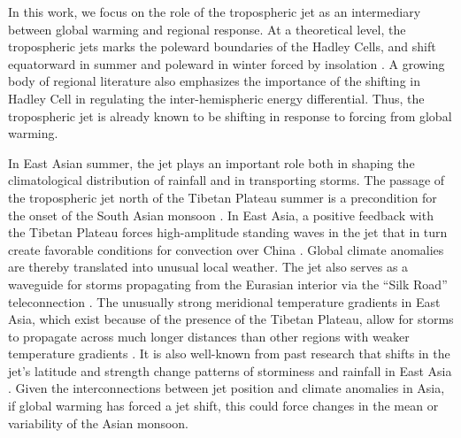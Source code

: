 	In this work, we focus on the role of the tropospheric jet as an intermediary between global warming and regional response. At a theoretical level, the tropospheric jets marks the poleward boundaries of the Hadley Cells, and shift equatorward in summer and poleward in winter forced by insolation \citep{Bordoni2008}. A growing body of regional literature also emphasizes the importance of the shifting in Hadley Cell in regulating the inter-hemispheric energy differential. Thus, the tropospheric jet is already known to be shifting in response to forcing from global warming.

	In East Asian summer, the jet plays an important role both in shaping the climatological distribution of rainfall and in transporting storms. The passage of the tropospheric jet north of the Tibetan Plateau summer is a precondition for the onset of the South Asian monsoon \citep{Yin1949,Yeh1959,Hahn1975}. In East Asia, a positive feedback with the Tibetan Plateau forces high-amplitude standing waves in the jet that in turn create favorable conditions for convection over China \citep{Yang2002,Molnar2010,Chen2015}. Global climate anomalies are thereby translated into unusual local weather\citep{Nigam1989,Broccoli1992,Park1997}. The jet also serves as a waveguide for storms propagating from the Eurasian interior via the ``Silk Road'' teleconnection \citep{Hoskins1993,Ambrizzi1997,Kosaka2012}. The unusually strong meridional temperature gradients in East Asia, which exist because of the presence of the Tibetan Plateau, allow for storms to propagate across much longer distances than other regions with weaker temperature gradients \citep{Branstator2002}. It is also well-known from past research that shifts in the jet's latitude and strength change patterns of storminess and rainfall in East Asia \citep{Liang1998,Branstator2002,Kwon2007,Du2009,Li2014}.  Given the interconnections between jet position and climate anomalies in Asia, if global warming has forced a jet shift, this could force changes in the mean or variability of the Asian monsoon.
	
